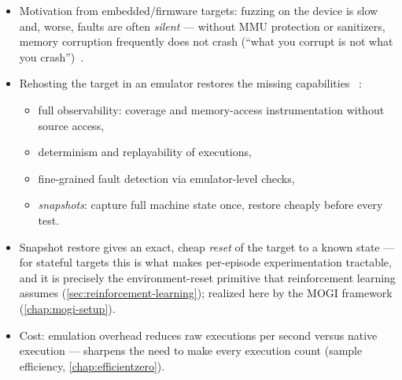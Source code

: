 \begin{itemize}
  \item Motivation from embedded/firmware targets: fuzzing on the device is slow and, worse,
    faults are often \emph{silent} --- without MMU protection or sanitizers, memory corruption
    frequently does not crash (``what you corrupt is not what you
    crash'')~\cite{muench_what_2018}.
  \item Rehosting the target in an emulator restores the missing capabilities~\cite{muench_what_2018}
    :
    \begin{itemize}
      \item full observability: coverage and memory-access instrumentation without source access,
      \item determinism and replayability of executions,
      \item fine-grained fault detection via emulator-level checks,
      \item \emph{snapshots}: capture full machine state once, restore cheaply before every test.
    \end{itemize}
  \item Snapshot restore gives an exact, cheap \emph{reset} of the target to a known state ---
    for stateful targets this is what makes per-episode experimentation tractable, and it is
    precisely the environment-reset primitive that reinforcement learning assumes
    (\cref{sec:reinforcement-learning}); realized here by the MOGI framework
    (\cref{chap:mogi-setup}).
  \item Cost: emulation overhead reduces raw executions per second versus native execution ---
    sharpens the need to make every execution count (sample efficiency,
    \cref{chap:efficientzero}).
\end{itemize}
